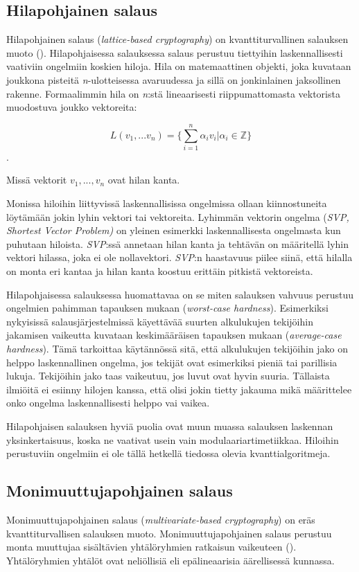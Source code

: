 \subsection{Hilapohjainen salaus}
Hilapohjainen salaus (\emph{lattice-based cryptography}) on kvanttiturvallinen salauksen muoto (\cite{regev2006lattice}). Hilapohjaisessa salauksessa salaus perustuu tiettyihin laskennallisesti vaativiin ongelmiin koskien hiloja. Hila on matemaattinen objekti, joka kuvataan joukkona pisteitä \emph{n}-ulotteisessa avaruudessa ja sillä on jonkinlainen jaksollinen rakenne. Formaalimmin hila on \emph{n}:stä lineaarisesti riippumattomasta vektorista muodostuva joukko vektoreita: 

\[L(v_1,...v_n) =\Bigg\{ {\sum_{i=1}^{n}\alpha_i 
v_i|\alpha_i \in \mathbb{Z}} \Bigg\}\]. 

Missä vektorit $v_1,...,v_n$ ovat hilan kanta.

Monissa hiloihin liittyvissä 
laskennallisissa ongelmissa ollaan kiinnostuneita löytämään jokin lyhin vektori tai vektoreita. Lyhimmän vektorin ongelma (\emph{SVP, Shortest Vector Problem)} on yleinen esimerkki laskennallisesta ongelmasta kun puhutaan hiloista. \emph{SVP}:ssä annetaan hilan kanta ja tehtävän on määritellä lyhin vektori hilassa, joka ei ole nollavektori. \emph{SVP}:n haastavuus piilee siinä, että hilalla on monta eri kantaa ja hilan kanta koostuu erittäin pitkistä vektoreista.

Hilapohjaisessa salauksessa huomattavaa on se miten salauksen vahvuus perustuu ongelmien pahimman tapauksen mukaan (\emph{worst-case hardness}). Esimerkiksi nykyisissä salausjärjestelmissä käyettävää suurten alkulukujen tekijöihin jakamisen vaikeutta kuvataan keskimääräisen tapauksen mukaan (\emph{average-case hardness}). Tämä tarkoittaa käytännössä sitä, että alkulukujen tekijöihin jako on helppo laskennallinen ongelma, jos tekijät ovat esimerkiksi pieniä tai parillisia lukuja. Tekijöihin jako taas vaikeutuu, jos luvut ovat hyvin suuria. Tällaista ilmiöitä ei esiinny hilojen kanssa, että olisi jokin tietty jakauma mikä määrittelee onko ongelma laskennallisesti helppo vai vaikea.

Hilapohjaisen salauksen hyviä puolia ovat muun muassa salauksen laskennan yksinkertaisuus, koska ne vaativat usein vain modulaariartimetiikkaa. Hiloihin perustuviin ongelmiin ei ole tällä hetkellä tiedossa olevia kvanttialgoritmeja.

\subsection{Monimuuttujapohjainen salaus}
Monimuuttujapohjainen salaus (\emph{multivariate-based cryptography}) on eräs kvanttiturvallisen salauksen muoto. Monimuuttujapohjainen salaus perustuu monta muuttujaa sisältävien yhtälöryhmien ratkaisun vaikeuteen (\cite{Ding2009}). Yhtälöryhmien yhtälöt ovat neliöllisiä eli epälineaarisia äärellisessä kunnassa.

